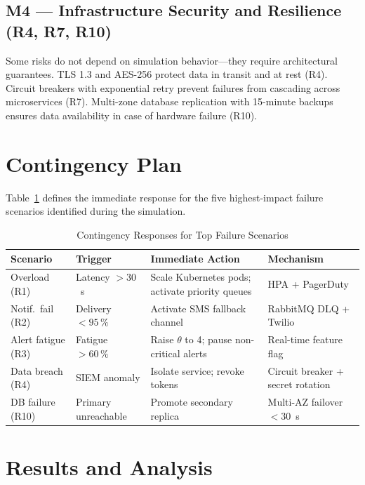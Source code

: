 \documentclass[conference,a4paper,10pt]{IEEEtran}
\begin{document}
\subsection{M4 --- Infrastructure Security and Resilience (R4, R7,
  R10)}

Some risks do not depend on simulation behavior---they require
architectural guarantees. TLS 1.3 and AES-256 protect data in
transit and at rest (R4). Circuit breakers with exponential retry
prevent failures from cascading across microservices (R7). Multi-zone
database replication with 15-minute backups ensures data availability
in case of hardware failure (R10).

\section{Contingency Plan}

Table~\ref{tab:contingency} defines the immediate response for the
five highest-impact failure scenarios identified during the simulation.

\begin{table}[H]
\caption{Contingency Responses for Top Failure Scenarios}
\label{tab:contingency}\centering\small
\begin{tabular}{p{1.4cm}p{1.6cm}p{2.2cm}p{1.5cm}}
\toprule
\textbf{Scenario} & \textbf{Trigger} &
\textbf{Immediate Action} & \textbf{Mechanism}\\
\midrule
Overload (R1) &
  Latency $>30$~s &
  Scale Kubernetes pods; activate priority queues &
  HPA + PagerDuty\\[4pt]
Notif.\ fail (R2) &
  Delivery $< 95\,\%$ &
  Activate SMS fallback channel &
  RabbitMQ DLQ + Twilio\\[4pt]
Alert fatigue (R3) &
  Fatigue $> 60\,\%$ &
  Raise $\theta$ to 4; pause non-critical alerts &
  Real-time feature flag\\[4pt]
Data breach (R4) &
  SIEM anomaly &
  Isolate service; revoke tokens &
  Circuit breaker + secret rotation\\[4pt]
DB failure (R10) &
  Primary unreachable &
  Promote secondary replica &
  Multi-AZ failover $< 30$~s\\
\bottomrule
\end{tabular}
\end{table}

\section{Results and Analysis}
\end{document}
